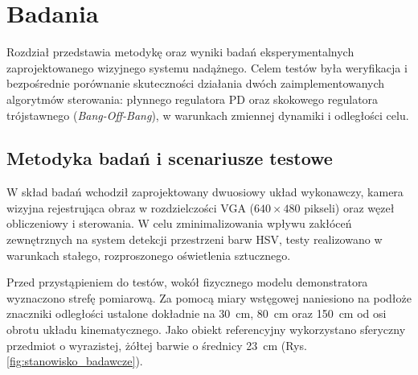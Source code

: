 \documentclass[a4paper,twoside,12pt]{book}
\begin{document}
%


\chapter{Badania}
\label{ch:badania}

Rozdział przedstawia metodykę oraz wyniki badań eksperymentalnych zaprojektowanego wizyjnego systemu nadążnego. Celem testów była weryfikacja i bezpośrednie porównanie skuteczności działania dwóch zaimplementowanych algorytmów sterowania: płynnego regulatora PD oraz skokowego regulatora trójstawnego (\textit{Bang-Off-Bang}), w warunkach zmiennej dynamiki i odległości celu.

\section{Metodyka badań i scenariusze testowe}
\label{sec:metodyka_badan}

W skład badań wchodził zaprojektowany dwuosiowy układ wykonawczy, kamera wizyjna rejestrująca obraz w rozdzielczości VGA ($640 \times 480$ pikseli) oraz węzeł obliczeniowy i sterowania. W celu zminimalizowania wpływu zakłóceń zewnętrznych na system detekcji przestrzeni barw HSV, testy realizowano w warunkach stałego, rozproszonego oświetlenia sztucznego. 

Przed przystąpieniem do testów, wokół fizycznego modelu demonstratora wyznaczono strefę pomiarową. Za pomocą miary wstęgowej naniesiono na podłoże znaczniki odległości ustalone dokładnie na 30~cm, 80~cm oraz 150~cm od osi obrotu układu kinematycznego. Jako obiekt referencyjny wykorzystano sferyczny przedmiot o wyrazistej, żółtej barwie o średnicy 23~cm (Rys. \ref{fig:stanowisko_badawcze}).
\end{document}
